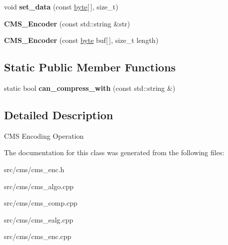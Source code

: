 \begin{DoxyCompactItemize}
\item 
\hypertarget{classBotan_1_1CMS__Encoder_aad94f925666d66e7ec54e760942d1b40}{void {\bfseries set\-\_\-data} (const \hyperlink{namespaceBotan_a7d793989d801281df48c6b19616b8b84}{byte}\mbox{[}$\,$\mbox{]}, size\-\_\-t)}\label{classBotan_1_1CMS__Encoder_aad94f925666d66e7ec54e760942d1b40}

\item 
\hypertarget{classBotan_1_1CMS__Encoder_a9c4743acc95fbbadcda5951bedbfc505}{{\bfseries C\-M\-S\-\_\-\-Encoder} (const std\-::string \&str)}\label{classBotan_1_1CMS__Encoder_a9c4743acc95fbbadcda5951bedbfc505}

\item 
\hypertarget{classBotan_1_1CMS__Encoder_a731ec102895cdb0d8ea36bafc9d210fc}{{\bfseries C\-M\-S\-\_\-\-Encoder} (const \hyperlink{namespaceBotan_a7d793989d801281df48c6b19616b8b84}{byte} buf\mbox{[}$\,$\mbox{]}, size\-\_\-t length)}\label{classBotan_1_1CMS__Encoder_a731ec102895cdb0d8ea36bafc9d210fc}

\end{DoxyCompactItemize}
\subsection*{Static Public Member Functions}
\begin{DoxyCompactItemize}
\item 
\hypertarget{classBotan_1_1CMS__Encoder_a9cc705436e976542301549a2e726549e}{static bool {\bfseries can\-\_\-compress\-\_\-with} (const std\-::string \&)}\label{classBotan_1_1CMS__Encoder_a9cc705436e976542301549a2e726549e}

\end{DoxyCompactItemize}


\subsection{Detailed Description}
C\-M\-S Encoding Operation 

The documentation for this class was generated from the following files\-:\begin{DoxyCompactItemize}
\item 
src/cms/cms\-\_\-enc.\-h\item 
src/cms/cms\-\_\-algo.\-cpp\item 
src/cms/cms\-\_\-comp.\-cpp\item 
src/cms/cms\-\_\-ealg.\-cpp\item 
src/cms/cms\-\_\-enc.\-cpp\end{DoxyCompactItemize}

